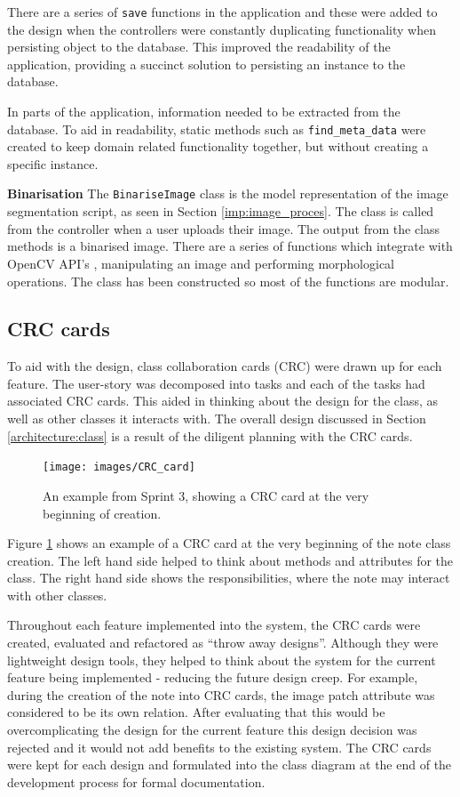 There are a series of \texttt{save} functions in the application and these were added to the design when the controllers were constantly duplicating functionality when persisting object to the database. This improved the readability of the application, providing a succinct solution to persisting an instance to the database.

In parts of the application, information needed to be extracted from the database. To aid in readability, static methods such as \texttt{find\_meta\_data} were created to keep domain related functionality together, but without creating a specific instance.

\noindent
\textbf{Binarisation}
\newline
The \texttt{BinariseImage} class is the model representation of the image segmentation script, as seen in Section \ref{imp:image_proces}. The class is called from the controller when a user uploads their image. The output from the class methods is a binarised image. There are a series of functions which integrate with OpenCV API's \cite{citeulike:13206865}, manipulating an image and performing morphological operations. The class has been constructed so most of the functions are modular.

\subsection{CRC cards} \label{design:CRC}
To aid with the design, class collaboration cards (CRC) were drawn up for each feature. The user-story was decomposed into tasks and each of the tasks had associated CRC cards. This aided in thinking about the design for the class, as well as other classes it interacts with.  The overall design discussed in Section \ref{architecture:class} is a result of the diligent planning with the CRC cards.

\begin{figure}[H]
  \centering
  \texttt{[image: images/CRC\_card]}
  \caption{An example from Sprint 3, showing a CRC card at the very beginning of creation.}
  \label{fig:crc1}
\end{figure}

Figure \ref{fig:crc1} shows an example of a CRC card at the very beginning of the note class creation. The left hand side helped to think about methods and attributes for the class. The right hand side shows the responsibilities, where the note may interact with other classes.

Throughout each feature implemented into the system, the CRC cards were created, evaluated and refactored as ``throw away designs''. Although they were lightweight design tools, they helped to think about the system for the current feature being implemented - reducing the future design creep. For example, during the creation of the note into CRC cards, the image patch attribute was considered to be its own relation. After evaluating that this would be overcomplicating the design for the current feature this design decision was rejected and it would not add benefits to the existing system. The CRC cards were kept for each design and formulated into the class diagram at the end of the development process for formal documentation.

